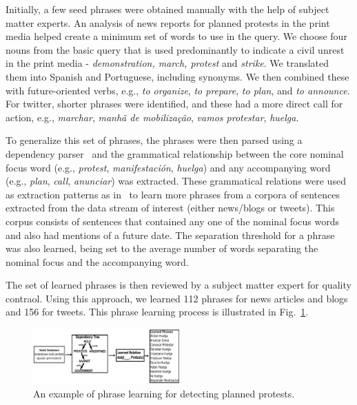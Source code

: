 Initially, a few seed phrases were obtained manually
with the help of subject matter experts.
An analysis of news reports for planned protests in the print media helped create a
minimum set of words to use in the query.  We choose four nouns from
the basic query that is used predominantly to indicate a civil unrest
in the print media - {\em demonstration, march, protest} and
{\it strike}. We translated them into Spanish and Portuguese, including
synonyms.  We then combined these with future-oriented verbs, e.g., {\em to organize}, {\em to prepare}, {\em to
plan}, and {\em to announce}. For twitter, shorter phrases were identified, and these had
a more direct call for action, e.g., {\em marchar}, {\em manhã de mobilização}, {\em
  vamos protestar}, {\em huelga}.

To generalize this set of phrases, the phrases were then parsed
using a dependency parser~\cite{freeling} and the grammatical
relationship between the core nominal focus word (e.g., {\em protest}, 
{\em manifestación}, {\em huelga}) and any accompanying
word (e.g., {\em plan}, {\em call}, {\em anunciar}) was
extracted. These grammatical relations were used as extraction
patterns as in~\cite{riloff2003learning} to learn more phrases from a
corpora of sentences extracted from the data stream of interest
(either news/blogs or tweets). This corpus consists of sentences that
contained any one of the nominal focus words and also had mentions of
a future date. The separation threshold for a phrase was also
learned, being set to the average number of words separating
the nominal focus and the accompanying word.

The set of learned phrases is then reviewed by a subject matter expert for quality contraol.  
Using this approach, we learned 112 phrases for news articles and blogs and 156 for tweets.  
This phrase learning process is illustrated in Fig.~\ref{fig:phraselearning}.

\begin{figure}
\includegraphics[width=0.5\textwidth]{figures/phraseLearning}
\vspace{-2em}
\caption{An example of phrase learning for detecting planned protests.}
\label{fig:phraselearning}
\end{figure}

